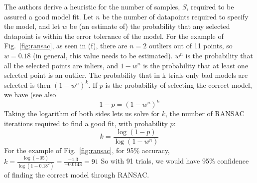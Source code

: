 The authors derive a heuristic for the number of samples, $S$, required to be assured a good model fit.  Let $n$ be the number of datapoints required to specify the model, and let $w$ be (an estimate of) the probability that any selected datapoint is within the error tolerance of the model.   For the example of Fig.~\ref{fig:ransac}, as seen in (f), there are $n=2$ outliers out of 11 points, so $w = 0.18$ (in general, this value needs to be estimated).  $w^n$ is the probability that all the selected points are inliers, and $1 -  w^n$ is the probability that at least one selected point is an outlier.  The probability that in k trials only bad models are selected is then $(1 -  w^n)^k$.  If $p$ is the probability of selecting the correct model, we have (see also \cite{wikiRANSAC}
\begin{equation}
    1-p = (1 -  w^n)^k
\end{equation}
Taking the logarithm of both sides lets us solve for $k$, the number of RANSAC iterations required to find a good fit, with probability $p$:
\begin{equation}
        k = \frac{\log(1-p)}{\log(1-w^n)}
        \label{eq:k}
\end{equation}
For the example of Fig.~\ref{fig:ransac}, for 95\% accuracy, $k = \frac{\log(-05)}{\log(1-0.18^2)} = \frac{-1.3}{-0.0143} = 91$
So with 91 trials, we would have 95\% confidence of finding the correct model through RANSAC. 


